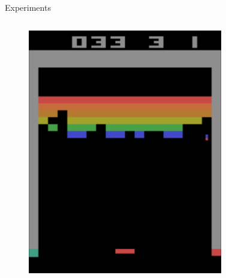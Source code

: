 \begin{frame}{Experiments}
\begin{columns}[c,onlytextwidth]
\begin{figure}
            \includegraphics[width=\textwidth]{images/atari-sequence-1.png}
        \end{figure}
        \begin{figure}

\end{figure}
\end{columns}
\end{frame}

